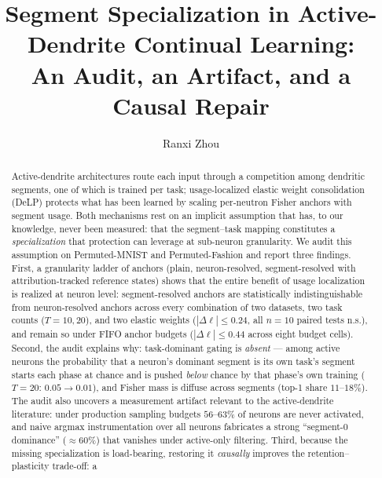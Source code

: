 \documentclass[review,12pt,number]{elsarticle}
\newcommand{\delp}{DeLP}
\begin{document}
\linenumbers

\begin{frontmatter}

\title{Segment Specialization in Active-Dendrite Continual Learning:\\
An Audit, an Artifact, and a Causal Repair}

\author[hnucm]{Ranxi Zhou}
\address[hnucm]{Hunan University of Chinese Medicine, 300 Xueshi Avenue,
Hanpu, Yuelu District, Changsha 410208, Hunan, China}

\begin{abstract}
Active-dendrite architectures route each input through a competition among
dendritic segments, one of which is trained per task; usage-localized elastic
weight consolidation (\delp{}) protects what has been learned by scaling
per-neutron Fisher anchors with segment usage. Both mechanisms rest on an
implicit assumption that has, to our knowledge, never been measured: that the
segment--task mapping constitutes a \emph{specialization} that protection can
leverage at sub-neuron granularity. We audit this assumption on Permuted-MNIST
and Permuted-Fashion and report three findings. First, a granularity ladder of
anchors (plain, neuron-resolved, segment-resolved with attribution-tracked
reference states) shows that the entire benefit of usage localization is
realized at neuron level: segment-resolved anchors are statistically
indistinguishable from neuron-resolved anchors across every combination of two
datasets, two task counts ($T{=}10,20$), and two elastic weights
($|\Delta\ell|\le 0.24$, all $n{=}10$ paired tests n.s.), and remain so under
FIFO anchor budgets ($|\Delta\ell|\le 0.44$ across eight budget cells).
Second, the audit explains why: task-dominant gating is \emph{absent} ---
among active neurons the probability that a neuron's dominant segment is its
own task's segment starts each phase at chance and is pushed \emph{below}
chance by that phase's own training ($T{=}20$: $0.05 \to 0.01$), and Fisher
mass is diffuse across segments (top-1 share $11$--$18\%$). The audit also
uncovers a measurement artifact relevant to the active-dendrite literature:
under production sampling budgets $56$--$63\%$ of neurons are never activated,
and naive argmax instrumentation over all neurons fabricates a strong
``segment-0 dominance'' ($\approx 60\%$) that vanishes under active-only
filtering. Third, because the missing specialization is load-bearing,
restoring it \emph{causally} improves the retention--plasticity trade-off: a

\end{abstract}
\end{frontmatter}
\end{document}
